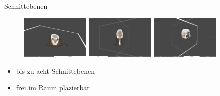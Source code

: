 \documentclass[final,hyperref={pdfpagelabels=false}]{beamer}
\begin{document}
\begin{frame}[t]
\begin{columns}[t]
\begin{column}{.465\textwidth}

\end{column} %



\begin{column}{.025\textwidth}\end{column} %

\begin{column}{.465\textwidth}

\begin{block}{Schnittebenen}

   \begin{figure}
       \includegraphics[width=0.325\textwidth]{slide01}
       \vspace{10px}
       \includegraphics[width=0.325\textwidth]{slide02}
       \vspace{10px}
       \includegraphics[width=0.325\textwidth]{slide03}
   \end{figure}
%   
%   
%   
%   
%   
   \begin{itemize}
   \item bis zu acht Schnittebenen
   \item frei im Raum plazierbar
   \end{itemize}
   

\end{block}
\end{column}
\end{columns}
\end{frame}
\end{document}
